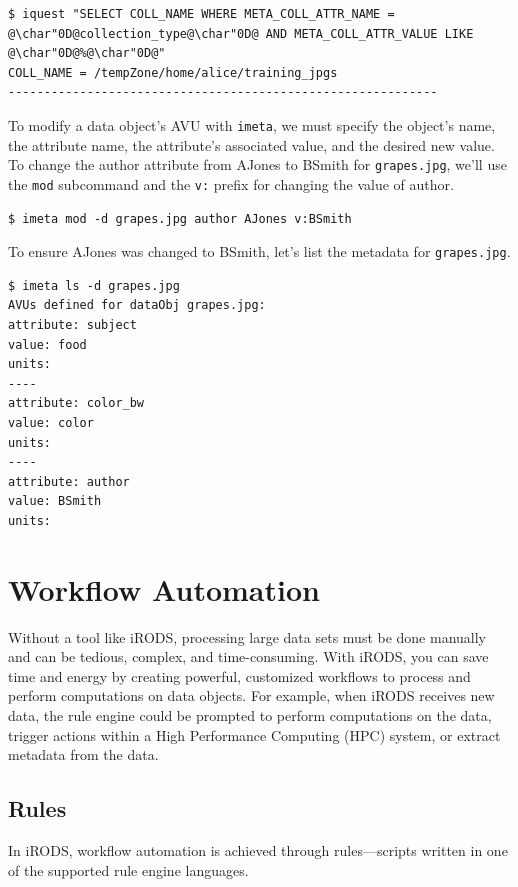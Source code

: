 \documentclass[10pt,oneside]{memoir}
\begin{document}
\begin{lstlisting}[basicstyle=\scriptsize\ttfamily]
$ iquest "SELECT COLL_NAME WHERE META_COLL_ATTR_NAME = @\char"0D@collection_type@\char"0D@ AND META_COLL_ATTR_VALUE LIKE @\char"0D@%@\char"0D@"
COLL_NAME = /tempZone/home/alice/training_jpgs
------------------------------------------------------------
\end{lstlisting}

To modify a data object's AVU with \texttt{imeta}, we must specify the object's name, the attribute name, the attribute's associated value, and the desired new value. To change the author attribute from AJones to BSmith for \texttt{grapes.jpg}, we'll use the \texttt{mod} subcommand and the \texttt{v:} prefix for changing the value of author.

\begin{lstlisting}
$ imeta mod -d grapes.jpg author AJones v:BSmith
\end{lstlisting}

To ensure AJones was changed to BSmith, let's list the metadata for \texttt{grapes.jpg}.

\begin{lstlisting}
$ imeta ls -d grapes.jpg
AVUs defined for dataObj grapes.jpg:
attribute: subject
value: food
units:
----
attribute: color_bw
value: color
units:
----
attribute: author
value: BSmith
units:
\end{lstlisting}

\chapter{Workflow Automation}

Without a tool like iRODS, processing large data sets must be done manually and can be tedious, complex, and time-consuming. With iRODS, you can save time and energy by creating powerful, customized workflows to process and perform computations on data objects. For example, when iRODS receives new data, the rule engine could be prompted to perform computations on the data, trigger actions within a High Performance Computing (HPC) system, or extract metadata from the data.

\section{Rules}

In iRODS, workflow automation is achieved through rules---scripts written in one of the supported rule engine languages.
\end{document}
